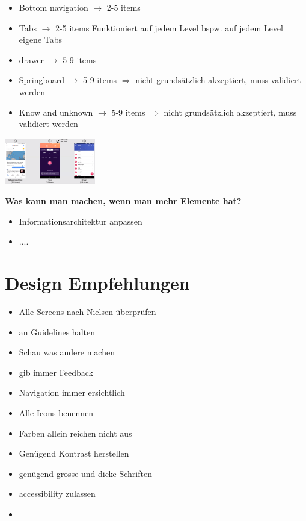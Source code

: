\documentclass{report}
\newenvironment{Figure}
	{\par\medskip\noindent\minipage{\linewidth}}
	{\endminipage\par\medskip}
\theoremstyle{definition}
\theoremstyle{example}
\begin{document}
\begin{itemize}
   \item Bottom navigation $\rightarrow$ 2-5 items
   \item Tabs $\rightarrow$ 2-5 items
   \subitem Funktioniert auf jedem Level bspw. auf jedem Level eigene Tabs 
   \item drawer $\rightarrow$ 5-9 items
   \item Springboard $\rightarrow$ 5-9 items $\Rightarrow$ nicht grundsätzlich akzeptiert, muss validiert werden
   \item  Know and unknown $\rightarrow$ 5-9 items $\Rightarrow$ nicht grundsätzlich akzeptiert, muss validiert werden
\end{itemize}

\begin{Figure}
   \centering
    \includegraphics[width=150px]{img/LateralNavigation.png}
        \label{fig:Lateral Navigation in Android}
\end{Figure}

\textbf{Was kann man machen, wenn man mehr Elemente hat?}
\begin{itemize}
   \item Informationsarchitektur anpassen
   \item ....
\end{itemize}

\section{Design Empfehlungen}
\begin{itemize}
   \item Alle Screens nach Nielsen überprüfen
   \item an Guidelines halten
   \item Schau was andere machen
   \item gib immer Feedback
   \item Navigation immer ersichtlich
   \item Alle Icons benennen
   \item Farben allein reichen nicht aus
   \item Genügend Kontrast herstellen
   \item genügend grosse und dicke Schriften
   \item accessibility zulassen
   \item 
\end{itemize}
\end{document}
